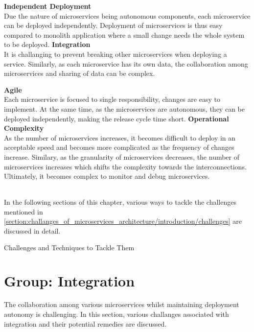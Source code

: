 \begin{multicols}{2}
  \textbf{Independent Deployment} \\Due the nature of microservices being autonomous components, each microservice can be deployed independently. Deployment of microservices is thus easy compared to monolith application where a small change needs the whole system to be deployed.\cite{Newman:2015aa}
  \vfill
  \columnbreak
  \textbf{Integration} \\It is challanging to prevent breaking other microservices when deploying a service. Similarly, as each microservice has its own data, the collaboration among microservices and sharing of data can be complex.
   \end{multicols}
   
  \begin{multicols}{2}
  \textbf{Agile}\\ Each microservice is focused to single responsibility, changes are easy to implement. At the same time, as the microservices are autonomous, they can be deployed independently, making the release cycle time short.
  \vfill
  \columnbreak
  \textbf{Operational Complexity} \\ As the number of microservices increases, it becomes difficult to deploy in an acceptable speed and becomes more complicated as the frequency of changes increase. Similary, as the granularity of microservices decreases, the number of microservices increases which shifts the complexity towards the interconnections. Ultimately, it becomes complex to monitor and debug microservices.
   \end{multicols}
\\
In the following sections of this chapter, various ways to tackle the challenges mentioned in \ref{section:challanges_of_microservices_architecture/introduction/challenges} are discussed in detail.

\begin{shaded}Challenges and Techniques to Tackle Them\end{shaded}\label{section:challanges_of_microservices_architecture/challenges_and_techniques_to_tackle_them}
\section{Group: Integration}\label{section:challanges_of_microservices_architecture/integration}
The collaboration among various microservices whilst maintaining deployment autonomy is challenging. In this section, various challanges associated with integration and their potential remedies are discussed.

